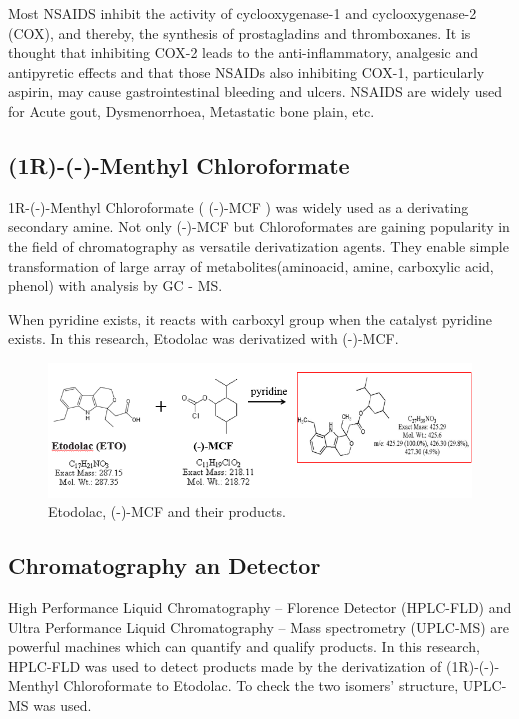 \documentclass[12pt]{article} %
\begin{document}
Most NSAIDS inhibit the activity of cyclooxygenase-1 and cyclooxygenase-2 (COX), and thereby, the synthesis of prostagladins and thromboxanes. It is thought that inhibiting COX-2 leads to the anti-inflammatory, analgesic and antipyretic effects and that those NSAIDs also inhibiting COX-1, particularly aspirin, may cause gastrointestinal bleeding and ulcers. \cite{asdf} NSAIDS are widely used for Acute gout, Dysmenorrhoea, Metastatic bone plain, etc. \cite{cadd}


\subsection{(1R)-(-)-Menthyl Chloroformate}


1R-(-)-Menthyl Chloroformate ( (-)-MCF ) was widely used as a derivating secondary amine. Not only (-)-MCF but Chloroformates are gaining popularity in the field of chromatography as versatile derivatization agents. They enable simple transformation of large array of metabolites(aminoacid, amine, carboxylic acid, phenol) with analysis by GC - MS.

When pyridine exists, it reacts with carboxyl group when the catalyst pyridine exists. In this research, Etodolac was derivatized with (-)-MCF.



\begin{figure}[h!]
  \includegraphics[width=\linewidth]{fig1.png}
  \caption{Etodolac, (-)-MCF and their products.}
  \label{fig:fig1}
\end{figure}


\subsection{Chromatography an Detector}


High Performance Liquid Chromatography – Florence Detector (HPLC-FLD)  and Ultra Performance Liquid Chromatography – Mass spectrometry (UPLC-MS) are powerful machines which can quantify and qualify products. 
In this research, HPLC-FLD was used to detect products made by the derivatization of (1R)-(-)-Menthyl Chloroformate to Etodolac. To check the two isomers' structure, UPLC-MS was used.
\end{document}
